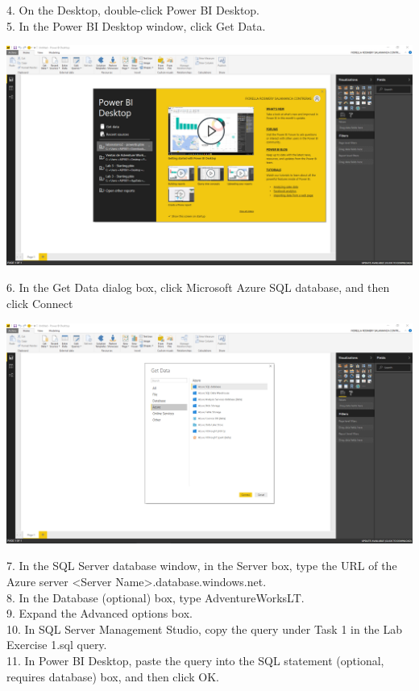 4. On the Desktop, double-click Power BI Desktop.\\
5. In the Power BI Desktop window, click Get Data.\\

	\begin{center}
	\includegraphics[width=17cm]{./Imagenes/Ejercicio1/Tarea2/3}
	\end{center}	

6. In the Get Data dialog box, click Microsoft Azure SQL database, and then click Connect\\

	\begin{center}
	\includegraphics[width=17cm]{./Imagenes/Ejercicio1/Tarea2/4}
	\end{center}	

7. In the SQL Server database window, in the Server box, type the URL of the Azure server <Server Name>.database.windows.net.\\
8. In the Database (optional) box, type AdventureWorksLT.\\
9. Expand the Advanced options box.\\
10. In SQL Server Management Studio, copy the query under Task 1 in the Lab Exercise 1.sql query.\\
11. In Power BI Desktop, paste the query into the SQL statement (optional, requires database) box, and then click OK.\\

